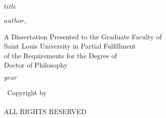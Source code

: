 \documentclass[phdthesis,12pt,final]{wuthesis}
\begin{document}
\begin{titlepage}
\begin{center}
\vspace*{0.5in} %

{\large\MakeUppercase{$title$}\par}

\vspace{1.7in} %

{\large $author$, \thesisauthorpreviousdegrees\par}

\vspace{3in} %

A Dissertation Presented to the Graduate Faculty of\\
Saint Louis University in Partial Fulfillment\\
of the Requirements for the Degree of\\
Doctor of Philosophy

\vfill %

$year$

\end{center}
\end{titlepage}

\setcounter{page}{2}

\cleardoublepage
\thispagestyle{empty}
\begin{thesiscopyrightpage}
    \vspace*{\fill}
    \begin{center}
    \textcopyright\ Copyright by\\
    \thesisauthor\\
    ALL RIGHTS RESERVED\\
    \thesisyear
    \end{center}
    \vspace*{-10cm} %
\end{thesiscopyrightpage}

\cleardoublepage
\thispagestyle{empty}

\vspace*{\fill}

\noindent\thesiscommittee

\vspace*{10cm} %
\end{document}
